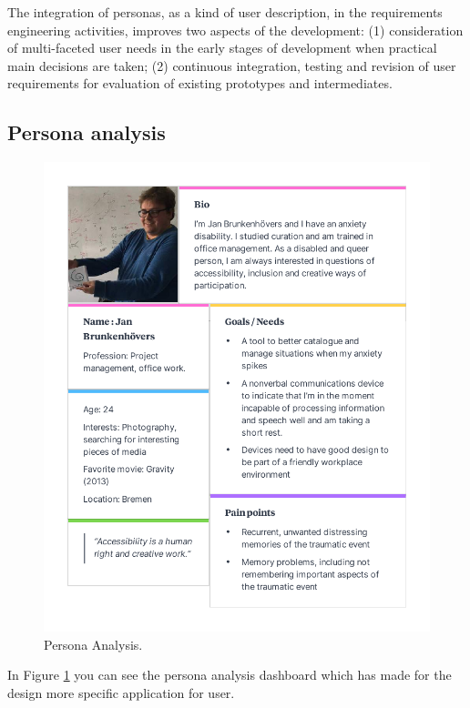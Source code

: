 The integration of personas, as a kind of user description, in the requirements engineering activities, improves two aspects of the development: (1) consideration of multi-faceted user needs in the early stages of development when practical main decisions are taken; (2) continuous integration, testing and revision of user requirements for evaluation of existing prototypes and intermediates.\citep{Mayas2016PersonasChallenges}

\subsection{Persona analysis}
\begin{figure}[hbt!] 
  \centering
  \includegraphics[width=1.05\linewidth]{chap3/image/persona_jans.pdf}
  \caption[Persona Analysis ]{Persona Analysis.}
  \label{fig:Persona_Analysis}
\end{figure}


In Figure \ref{fig:Persona_Analysis} you can see the persona analysis dashboard which has made for the design more specific application for user.

